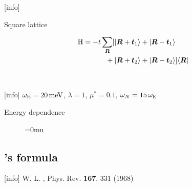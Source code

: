\documentclass[10pt]{beamer}
\begin{document}
    [info]{}

    \begin{frame}[label=lattice]{Square lattice}
        \begin{figure}
            \small
            \begin{minipage}[c][4cm][c]{12cm/3}
                
            \end{minipage}%
            \begin{minipage}[c][4cm][c]{16cm/3}
                \begin{align*}
                    \mathrm H = -t \sum_{\boldsymbol R}
                         [  |\boldsymbol R + \boldsymbol t_1\rangle
                         &+ |\boldsymbol R - \boldsymbol t_1\rangle \\{}
                          + |\boldsymbol R + \boldsymbol t_2\rangle
                         &+ |\boldsymbol R - \boldsymbol t_2\rangle ]
                    \langle\boldsymbol R|
                \end{align*}
            \end{minipage}\\
            
        \end{figure}
    \end{frame}

    [info]{%
        $\omega \sb{\text{E}} = 20 \, \mathrm{meV}$, $\lambda = 1$, $\mu^* = 0.1$,
        $\omega_N = 15 \, \omega \sb{\text{E}}$}

    \begin{frame}[label=energy]{Energy dependence}
        \begin{figure}
            \small
            \centering
            \medmuskip=0mu
            
            
            
        \end{figure}
    \end{frame}

    \subsection{'s formula}

    [info]{%
        W. L. , Phys. Rev. \textbf{167}, 331 (1968)}

    \newsavebox\McMillanA
    \newsavebox\McMillanB
\end{document}
